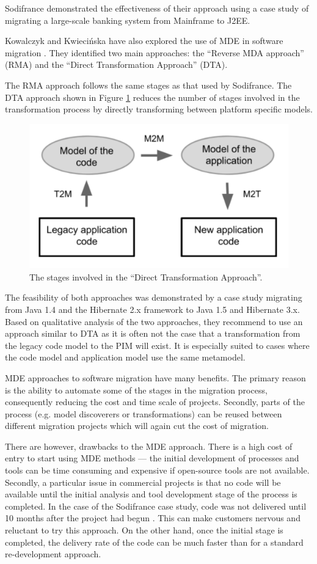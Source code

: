 \documentclass{UoYCSproject}
\begin{document}
Sodifrance demonstrated the effectiveness of their approach using a case study of migrating a large-scale banking system from Mainframe to J2EE.

Kowalczyk and Kwieci\'nska have also explored the use of MDE in software migration \parencite{kowalczyk2009model}. They identified two main approaches: the ``Reverse MDA approach'' (RMA) and the ``Direct Transformation Approach'' (DTA).

The RMA approach follows the same stages as that used by Sodifrance. The DTA approach shown in Figure \ref{fig:dta} reduces the number of stages involved in the transformation process by directly transforming between platform specific models. 

\begin{figure}[h!]
  \centering
  \includegraphics[width=0.6\linewidth]{graphics/dta.png}
  \caption{The stages involved in the ``Direct Transformation Approach''.}
  \label{fig:dta}
\end{figure}

The feasibility of both approaches was demonstrated by a case study migrating from Java 1.4 and the Hibernate 2.x framework to Java 1.5 and Hibernate 3.x. Based on qualitative analysis of the two approaches, they recommend to use an approach similar to DTA as it is often not the case that a transformation from the legacy code model to the PIM will exist. It is especially suited to cases where the code model and application model use the same metamodel. 

MDE approaches to software migration have many benefits. The primary reason is the ability to automate some of the stages in the migration process, consequently reducing the cost and time scale of projects. Secondly, parts of the process (e.g. model discoverers or transformations) can be reused between different migration projects which will again cut the cost of migration.

There are however, drawbacks to the MDE approach. There is a high cost of entry to start using MDE methods --- the initial development of processes and tools can be time consuming and expensive if open-source tools are not available. Secondly, a particular issue in commercial projects is that no code will be available until the initial analysis and tool development stage of the process is completed. In the case of the Sodifrance case study, code was not delivered until 10 months after the project had begun \parencite{fleurey2007model}. This can make customers nervous and reluctant to try this approach. On the other hand, once the initial stage is completed, the delivery rate of the code can be much faster than for a standard re-development approach.
\end{document}

